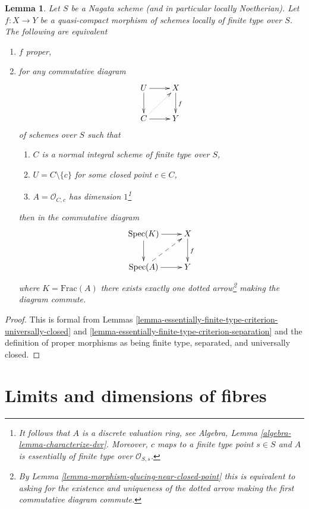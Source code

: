 \documentclass{stacks-project}
\theoremstyle{plain}
\newtheorem{lemma}[subsection]{Lemma}
\theoremstyle{definition}
\theoremstyle{remark}
\numberwithin{equation}{subsection}
\def\Spec{\mathop{\mathrm{Spec}}}
\begin{document}
\begin{lemma}
\label{lemma-essentially-finite-type-criterion-proper}
Let $S$ be a Nagata scheme (and in particular locally Noetherian).
Let $f : X \to Y$ be a quasi-compact morphism of schemes locally
of finite type over $S$. The following are equivalent
\begin{enumerate}
\item $f$ proper,
\item for any commutative diagram
$$
\xymatrix{
U \ar[r] \ar[d] & X \ar[d]^f \\
C \ar[r] \ar@{..>}[ru] & Y
}
$$
of schemes over $S$ such that
\begin{enumerate}
\item $C$ is a normal integral scheme of finite type over $S$,
\item $U = C \setminus \{c\}$ for some closed point $c \in C$,
\item $A = \mathcal{O}_{C, c}$ has dimension $1$\footnote{It follows
that $A$ is a discrete valuation ring, see
Algebra, Lemma \ref{algebra-lemma-characterize-dvr}.
Moreover, $c$ maps to a finite type point $s \in S$ and
$A$ is essentially of finite type over $\mathcal{O}_{S, s}$.}
\end{enumerate}
then in the commutative diagram
$$
\xymatrix{
\Spec(K) \ar[r] \ar[d] & X \ar[d]^f \\
\Spec(A) \ar[r] \ar@{-->}[ru] & Y
}
$$
where $K = \text{Frac}(A)$ there exists exactly one dotted arrow\footnote{By
Lemma \ref{lemma-morphism-glueing-near-closed-point} this is
equivalent to asking for the existence and uniqueness of the dotted arrow
making the first commutative diagram commute.}
making the diagram commute.
\end{enumerate}
\end{lemma}

\begin{proof}
This is formal from Lemmas
\ref{lemma-essentially-finite-type-criterion-universally-closed} and
\ref{lemma-essentially-finite-type-criterion-separation}
and the definition of proper morphisms as being finite type, separated,
and universally closed.
\end{proof}






\section{Limits and dimensions of fibres}
\label{section-limits-dimension}
\end{document}
